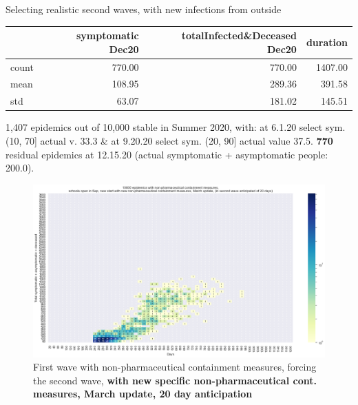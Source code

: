 \documentclass[8pt]{beamer}
\begin{document}
\begin{frame}{Selecting realistic second waves, with new infections from outside}



\begin{table}[H]
\center
\tiny

\begin{tabular}{lrrr}
\toprule
{} &  symptomatic Dec20 &  totalInfected\&Deceased Dec20 &  duration \\
\midrule
count &   770.00 &                     770.00 & 1407.00 \\
mean  &   108.95 &                     289.36 &  391.58 \\
std   &    63.07 &                     181.02 &  145.51 \\
\bottomrule
\end{tabular}

\label{selSpontWave2Contr2Tab}
\end{table}

{\tiny
1,407 epidemics out of 10,000  stable in Summer 2020, with: at 6.1.20 select sym. (10, 70] actual v. 33.3 \& at 9.20.20 select sym. (20, 90] actual value 37.5. \textbf{770} residual epidemics at 12.15.20 (actual symptomatic +  asymptomatic people: 200.0).}


\begin{figure}[H]
\center
\includegraphics[scale=0.19]{10kForceWave2Contr2M-20.png}
\caption{First wave with non-pharmaceutical containment measures, forcing the second wave, \textbf{with new specific non-pharmaceutical cont. measures, March update, 20 day anticipation}} 
\label{selForceWave2Contr2M-20}
\end{figure}

\end{frame}
\end{document}
